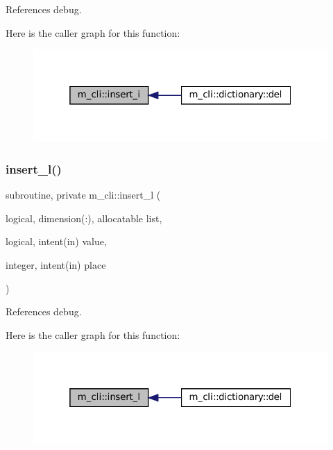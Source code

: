 References debug.

Here is the caller graph for this function\+:
\nopagebreak
\begin{figure}[H]
\begin{center}
\leavevmode
\includegraphics[width=319pt]{namespacem__cli_a841685591ef1f1827fc1fe32a7f546f1_icgraph}
\end{center}
\end{figure}
\mbox{\label{namespacem__cli_a0c1b22c46470afbb4ee5c67180335578}} 
\subsubsection{\texorpdfstring{insert\+\_\+l()}{insert\_l()}}
{\footnotesize\ttfamily subroutine, private m\+\_\+cli\+::insert\+\_\+l (\begin{DoxyParamCaption}\item[{logical, dimension(\+:), allocatable}]{list,  }\item[{logical, intent(in)}]{value,  }\item[{integer, intent(in)}]{place }\end{DoxyParamCaption})\hspace{0.3cm}{\ttfamily [private]}}



References debug.

Here is the caller graph for this function\+:
\nopagebreak
\begin{figure}[H]
\begin{center}
\leavevmode
\includegraphics[width=319pt]{namespacem__cli_a0c1b22c46470afbb4ee5c67180335578_icgraph}
\end{center}
\end{figure}
\mbox{\label{namespacem__cli_a4bfb90e14824f94017b1d4fcb39f0701}} 
